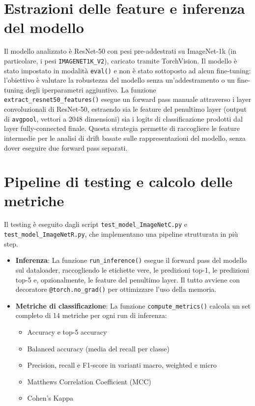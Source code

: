 \section{Estrazioni delle feature e inferenza del modello}
Il modello analizzato è ResNet-50 con pesi pre-addestrati su ImageNet-1k (in particolare, i pesi \newline \texttt{IMAGENET1K\_V2}), caricato tramite TorchVision. Il modello è stato impostato in modalità \texttt{eval()} e non è stato sottoposto ad alcun fine-tuning: l'obiettivo è valutare la robustezza del modello senza un'addestramento o un fine-tuning degli iperparametri aggiuntivo.
La funzione \texttt{extract\_resnet50\_features()} esegue un forward pass manuale attraverso i layer convoluzionali di ResNet-50, estraendo sia le feature del penultimo layer (output di \texttt{avgpool}, vettori a 2048 dimensioni) sia i logits di classificazione prodotti dal layer fully-connected finale. Questa strategia permette di raccogliere le feature intermedie per le analisi di drift basate sulle rappresentazioni del modello, senza dover eseguire due forward pass separati.

\section{Pipeline di testing e calcolo delle metriche}
Il testing è eseguito dagli script \texttt{test\_model\_ImageNetC.py} e \texttt{test\_model\_ImageNetR.py}, che implementano una pipeline strutturata in più step.
\begin{itemize}
	\item \textbf{Inferenza}: La funzione \texttt{run\_inference()} esegue il forward pass del modello sul dataloader, raccogliendo le etichette vere, le predizioni top-1, le predizioni top-5 e, opzionalmente, le feature del penultimo layer. Il tutto avviene con decoratore \texttt{@torch.no\_grad()} per ottimizzare l'uso della memoria.
	\item \textbf{Metriche di classificazione}: La funzione \texttt{compute\_metrics()} calcola un set completo di 14 metriche per ogni run di inferenza:
	\begin{itemize}
		\item Accuracy e top-5 accuracy
		\item Balanced accuracy (media del recall per classe)
		\item Precision, recall e F1-score in varianti macro, weighted e micro
		\item Matthews Correlation Coefficient (MCC)
		\item Cohen's Kappa
	\end{itemize} 
\end{itemize}

